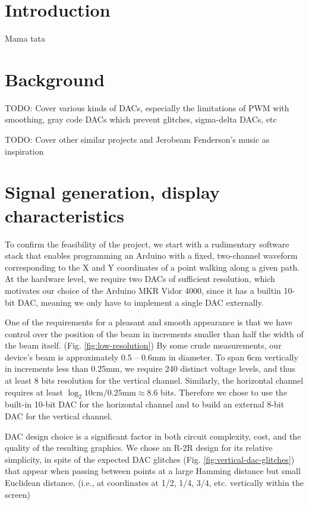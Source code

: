\documentclass[12pt]{article}
\begin{document}
\section{Introduction}

Mama tata

\section{Background}

TODO: Cover various kinds of DACs, especially the limitations of PWM with smoothing, gray code DACs which prevent glitches, sigma-delta DACs, etc

TODO: Cover other similar projects and Jerobeam Fenderson's music as inspiration

\section{Signal generation, display characteristics}

To confirm the feasibility of the project, we start with a rudimentary software stack that enables programming an Arduino with a fixed, two-channel waveform corresponding to the X and Y coordinates of a point walking along a given path. At the hardware level, we require two DACs of sufficient resolution, which motivates our choice of the Arduino MKR Vidor 4000, since it has a builtin 10-bit DAC, meaning we only have to implement a single DAC externally.

One of the requirements for a pleasant and smooth appearance is that we have control over the position of the beam in increments smaller than half the width of the beam itself. (Fig. \ref{fig:low-resolution}) By some crude measurements, our device's beam is approximately 0.5 -- 0.6mm in diameter. To span 6cm vertically in increments less than 0.25mm, we require 240 distinct voltage levels, and thus at least 8 bits resolution for the vertical channel. Similarly, the horizontal channel requires at least \( \log_2{10\text{cm}/0.25\text{mm}} \approx 8.6 \) bits. Therefore we chose to use the built-in 10-bit DAC for the horizontal channel and to build an external 8-bit DAC for the vertical channel.

DAC design choice is a significant factor in both circuit complexity, cost, and the quality of the resulting graphics. We chose an R-2R design for its relative simplicity, in spite of the expected DAC glitches (Fig. \ref{fig:vertical-dac-glitches}) that appear when passing between points at a large Hamming distance but small Euclidean distance. (i.e., at coordinates at 1/2, 1/4, 3/4, etc. vertically within the screen)
\end{document}
